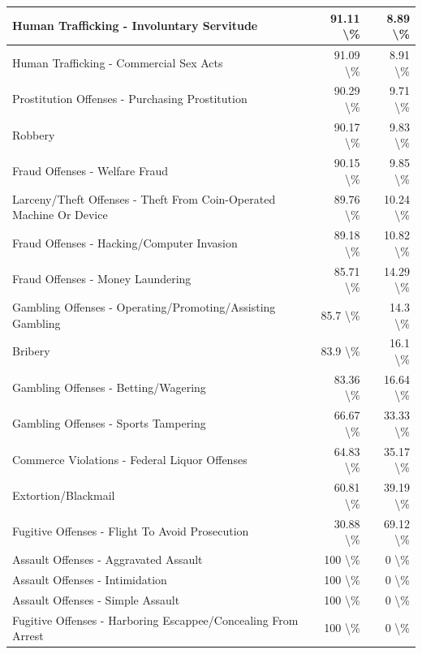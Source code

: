 \documentclass[
]{krantz}
\begin{document}
\begin{longtable}[t]{l|r|r}
\hline
Human Trafficking - Involuntary Servitude & 91.11 \textbackslash{}\% & 8.89 \textbackslash{}\%\\
\hline
Human Trafficking - Commercial Sex Acts & 91.09 \textbackslash{}\% & 8.91 \textbackslash{}\%\\
\hline
Prostitution Offenses - Purchasing Prostitution & 90.29 \textbackslash{}\% & 9.71 \textbackslash{}\%\\
\hline
Robbery & 90.17 \textbackslash{}\% & 9.83 \textbackslash{}\%\\
\hline
Fraud Offenses - Welfare Fraud & 90.15 \textbackslash{}\% & 9.85 \textbackslash{}\%\\
\hline
Larceny/Theft Offenses - Theft From Coin-Operated Machine Or Device & 89.76 \textbackslash{}\% & 10.24 \textbackslash{}\%\\
\hline
Fraud Offenses - Hacking/Computer Invasion & 89.18 \textbackslash{}\% & 10.82 \textbackslash{}\%\\
\hline
Fraud Offenses - Money Laundering & 85.71 \textbackslash{}\% & 14.29 \textbackslash{}\%\\
\hline
Gambling Offenses - Operating/Promoting/Assisting Gambling & 85.7 \textbackslash{}\% & 14.3 \textbackslash{}\%\\
\hline
Bribery & 83.9 \textbackslash{}\% & 16.1 \textbackslash{}\%\\
\hline
Gambling Offenses - Betting/Wagering & 83.36 \textbackslash{}\% & 16.64 \textbackslash{}\%\\
\hline
Gambling Offenses - Sports Tampering & 66.67 \textbackslash{}\% & 33.33 \textbackslash{}\%\\
\hline
Commerce Violations - Federal Liquor Offenses & 64.83 \textbackslash{}\% & 35.17 \textbackslash{}\%\\
\hline
Extortion/Blackmail & 60.81 \textbackslash{}\% & 39.19 \textbackslash{}\%\\
\hline
Fugitive Offenses - Flight To Avoid Prosecution & 30.88 \textbackslash{}\% & 69.12 \textbackslash{}\%\\
\hline
Assault Offenses - Aggravated Assault & 100 \textbackslash{}\% & 0 \textbackslash{}\%\\
\hline
Assault Offenses - Intimidation & 100 \textbackslash{}\% & 0 \textbackslash{}\%\\
\hline
Assault Offenses - Simple Assault & 100 \textbackslash{}\% & 0 \textbackslash{}\%\\
\hline
Fugitive Offenses - Harboring Escappee/Concealing From Arrest & 100 \textbackslash{}\% & 0 \textbackslash{}\%\\

\end{longtable}
\end{document}
